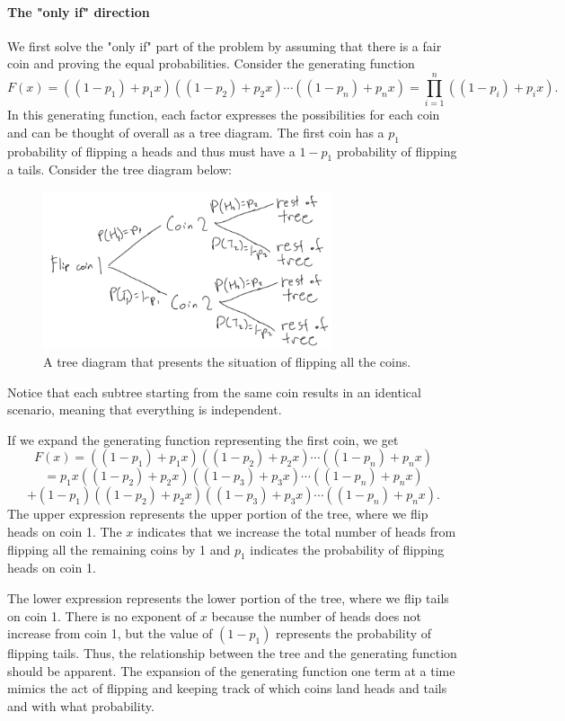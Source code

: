 \documentclass[12pt]{article}
\begin{document}
\paragraph{The "only if" direction}
We first solve the "only if" part of the problem by assuming that there is a fair coin and proving the equal probabilities. Consider the generating function \begin{equation}\label{coins} F(x)=((1-p_1) + p_1 x)((1-p_2)+p_2x)\cdots ((1-p_n) + p_n x)=\prod_{i=1}^n ((1-p_i) + p_i x).\end{equation} In this generating function, each factor expresses the possibilities for each coin and can be thought of overall as a tree diagram. The first coin has a $p_1$ probability of flipping a heads and thus must have a $1-p_1$ probability of flipping a tails.
Consider the tree diagram below:
\begin{figure}[H]
    \centering
    \includegraphics[width=8.5cm]{Diagram.png}
    \caption{A tree diagram that presents the situation of flipping all the coins.}
    \label{fig:my_label}
\end{figure}
Notice that each subtree starting from the same coin results in an identical scenario, meaning that everything is independent.

If we expand the generating function representing the first coin, we get 
\[F(x)=((1-p_1) + p_1 x)((1-p_2)+p_2x)\cdots ((1-p_n) + p_n x)\]\[=p_1 x((1-p_2) + p_2 x)((1-p_3)+p_3x)\cdots ((1-p_n) + p_n x) \]\[+ (1-p_1)((1-p_2) + p_2 x)((1-p_3)+p_3x)\cdots ((1-p_n) + p_n x).\]
The upper expression represents the upper portion of the tree, where we flip heads on coin 1. The $x$ indicates that we increase the total number of heads from flipping all the remaining coins by 1 and $p_1$ indicates the probability of flipping heads on coin 1.

The lower expression represents the lower portion of the tree, where we flip tails on coin 1. There is no exponent of $x$ because the number of heads does not increase from coin 1, but the value of $(1-p_1)$ represents the probability of flipping tails. Thus, the relationship between the tree and the generating function should be apparent. The expansion of the generating function one term at a time mimics the act of flipping and keeping track of which coins land heads and tails and with what probability.
\end{document}
